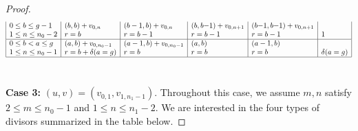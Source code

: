 \documentclass[11pt]{article}
\theoremstyle{definition}
\numberwithin{equation}{section}
\begin{document}
\begin{proof}
{\[\begin{array}{|l|l|l|l|l|l|}
    0 \leq b \leq g-1
    & (b,b) + v_{0,n} 
    & (b-1,b) + v_{0,n}
    & (b,b{-}1) + v_{0,n+1}
    & (b{-}1,b{-}1) + v_{0,n+1}
    &
    \\
    1 \leq n \leq n_0-2
    & r = b
    & r = b-1
    & r = b-1
    & r = b-1
    & 1
    \\\hline

    0 \leq b < a \leq g
    & (a,b) + v_{0,n_0-1}
    & (a-1,b) + v_{0,n_0-1}
    & (a,b)
    & (a-1,b)
    &
    \\
    1 \leq n \leq n_0-1
    & r = b + \delta(a=g)
    & r = b
    & r = b
    & r = b
    & \delta(a=g)
    \\\hline
    \end{array}\]} \
    
    \noindent\textbf{Case 3:} $(u,v) = (v_{0,1},v_{1,n_1-1})$.
    Throughout this case, we assume $m,n$ satisfy $2 \leq m \leq n_0-1$ and $1 \leq n \leq n_1-2$.  We are interested in the four types of divisors summarized in the table below.
    

\end{proof}
\end{document}
